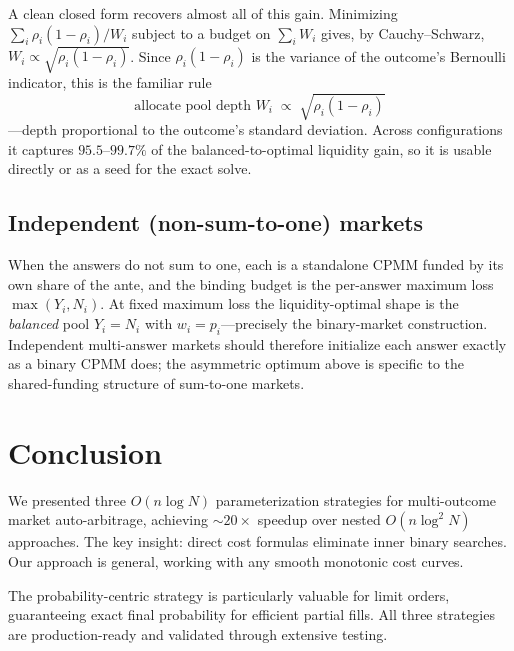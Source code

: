 \documentclass[11pt]{article}
\begin{document}
A clean closed form recovers almost all of this gain. Minimizing $\sum_i \rho_i(1-\rho_i)/W_i$ subject to a budget on $\sum_i W_i$ gives, by Cauchy--Schwarz, $W_i \propto \sqrt{\rho_i(1-\rho_i)}$. Since $\rho_i(1-\rho_i)$ is the variance of the outcome's Bernoulli indicator, this is the familiar rule
\begin{equation}
\boxed{\;\text{allocate pool depth } W_i \;\propto\; \sqrt{\rho_i(1-\rho_i)}\;}
\end{equation}
---depth proportional to the outcome's standard deviation. Across configurations it captures $95.5$--$99.7\%$ of the balanced-to-optimal liquidity gain, so it is usable directly or as a seed for the exact solve.

\subsection{Independent (non-sum-to-one) markets}

When the answers do not sum to one, each is a standalone CPMM funded by its own share of the ante, and the binding budget is the per-answer maximum loss $\max(Y_i, N_i)$. At fixed maximum loss the liquidity-optimal shape is the \emph{balanced} pool $Y_i = N_i$ with $w_i = p_i$---precisely the binary-market construction. Independent multi-answer markets should therefore initialize each answer exactly as a binary CPMM does; the asymmetric optimum above is specific to the shared-funding structure of sum-to-one markets.

\section{Conclusion}

We presented three $O(n \log N)$ parameterization strategies for multi-outcome market auto-arbitrage, achieving $\sim 20\times$ speedup over nested $O(n \log^2 N)$ approaches. The key insight: direct cost formulas eliminate inner binary searches. Our approach is general, working with any smooth monotonic cost curves.

The probability-centric strategy is particularly valuable for limit orders, guaranteeing exact final probability for efficient partial fills. All three strategies are production-ready and validated through extensive testing.
\end{document}
